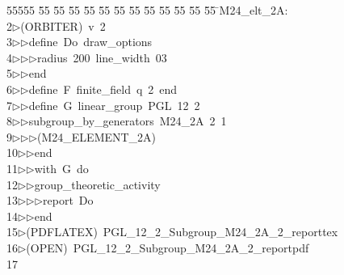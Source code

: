 %
%
\begin{tabbing}
55555 \= 55 \= 55 \= 55 \= 55 \= 55 \= 55 \= 55 \= 55 \= 55 \= 55 \= 55 \= 55 \= \>M24\_elt\_2A:\\[0pt]
2\>$\triangleright$\>(ORBITER)\ v\ 2\ \\[0pt]
3\>$\triangleright$\>$\triangleright$\>define\ Do\ draw\_options\ \\[0pt]
4\>$\triangleright$\>$\triangleright$\>$\triangleright$\>radius\ 200\ line\_width\ 03\ \\[0pt]
5\>$\triangleright$\>$\triangleright$\>end\ \\[0pt]
6\>$\triangleright$\>$\triangleright$\>define\ F\ finite\_field\ q\ 2\ end\ \\[0pt]
7\>$\triangleright$\>$\triangleright$\>define\ G\ linear\_group\ PGL\ 12\ 2\ \\[0pt]
8\>$\triangleright$\>$\triangleright$\>subgroup\_by\_generators\ M24\_2A\ 2\ 1\ \\[0pt]
9\>$\triangleright$\>$\triangleright$\>$\triangleright$\>(M24\_ELEMENT\_2A)\ \\[0pt]
10\>$\triangleright$\>$\triangleright$\>end\ \\[0pt]
11\>$\triangleright$\>$\triangleright$\>with\ G\ do\ \\[0pt]
12\>$\triangleright$\>$\triangleright$\>group\_theoretic\_activity\ \\[0pt]
13\>$\triangleright$\>$\triangleright$\>$\triangleright$\>report\ Do\ \\[0pt]
14\>$\triangleright$\>$\triangleright$\>end\\[0pt]
15\>$\triangleright$\>(PDFLATEX)\ PGL\_12\_2\_Subgroup\_M24\_2A\_2\_reporttex\\[0pt]
16\>$\triangleright$\>(OPEN)\ PGL\_12\_2\_Subgroup\_M24\_2A\_2\_reportpdf\\[0pt]
17\>\end{tabbing}
